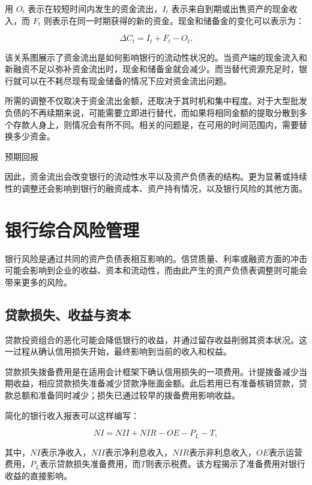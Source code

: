 用 $O_t$ 表示在较短时间内发生的资金流出，$I_t$ 表示来自到期或出售资产的现金收入，而 $F_t$ 则表示在同一时期获得的新的资金。现金和储备金的变化可以表示为：

\begin{equation}
\Delta C_t=I_t+F_t-O_t.
\label{eq:ch12-liquidity-adjustment}
\end{equation}

该关系图展示了资金流出是如何影响银行的流动性状况的。当资产端的现金流入和新融资不足以弥补资金流出时，现金和储备金就会减少。而当替代资源充足时，银行就可以在不耗尽现有现金储备的情况下应对资金流出问题。

所需的调整不仅取决于资金流出金额，还取决于其时机和集中程度。对于大型批发负债的不再续期来说，可能需要立即进行替代，而如果将相同金额的提取分散到多个存款人身上，则情况会有所不同。相关的问题是，在可用的时间范围内，需要替换多少资金。

预期回报

因此，资金流出会改变银行的流动性水平以及资产负债表的结构。更为显著或持续性的调整还会影响到银行的融资成本、资产持有情况，以及银行风险的其他方面。

\section{银行综合风险管理}

银行风险是通过共同的资产负债表相互影响的。信贷质量、利率或融资方面的冲击可能会影响到企业的收益、资本和流动性，而由此产生的资产负债表调整则可能会带来更多的风险。

\subsection{贷款损失、收益与资本}

贷款投资组合的恶化可能会降低银行的收益，并通过留存收益削弱其资本状况。这一过程从确认信用损失开始，最终影响到当前的收入和权益。

贷款损失拨备费用是在适用会计框架下确认信用损失的一项费用。计提拨备减少当期收益，相应贷款损失准备减少贷款净账面金额。此后若用已有准备核销贷款，贷款总额和准备同时减少；损失已通过较早的拨备费用影响收益。

简化的银行收入报表可以这样编写：

\begin{equation}
\textit{NI}=\textit{NII}+\textit{NIR}-\textit{OE}-P_L-T,
\label{eq:ch12-bank-net-income}
\end{equation}

其中，$\textit{NI}$表示净收入，$\textit{NII}$表示净利息收入，$\textit{NIR}$表示非利息收入，$\textit{OE}$表示运营费用，$P_L$表示贷款损失准备费用，而$T$则表示税费。该方程揭示了准备费用对银行收益的直接影响。

